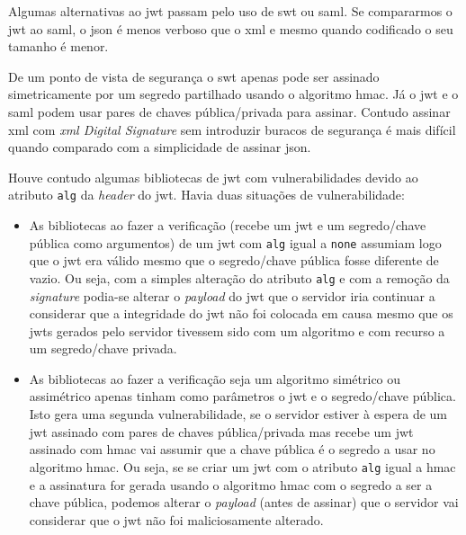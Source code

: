 Algumas alternativas ao \acrshort{jwt} passam pelo uso de \acrfull{swt} ou \acrfull{saml}. Se compararmos o \acrshort{jwt} ao \acrshort{saml}, o \acrshort{json} é menos verboso que o \acrshort{xml} e mesmo quando codificado o seu tamanho é menor. 

De um ponto de vista de segurança o \acrshort{swt} apenas pode ser assinado simetricamente por um segredo partilhado usando o algoritmo \acrshort{hmac}. Já o \acrshort{jwt} e o \acrshort{saml} podem usar pares de chaves pública/privada para assinar. Contudo assinar \acrshort{xml} com \textit{\acrshort{xml} Digital Signature} sem introduzir buracos de segurança é mais difícil quando comparado com a simplicidade de assinar \acrshort{json}.~\cite{jwtio}

Houve contudo algumas bibliotecas de \acrshort{jwt} com vulnerabilidades devido ao atributo \texttt{alg} da \textit{header} do \acrshort{jwt}. Havia duas situações de vulnerabilidade:
\begin{itemize}
    \item As bibliotecas ao fazer a verificação (recebe um \acrshort{jwt} e um segredo/chave pública como argumentos) de um \acrshort{jwt} com \texttt{alg} igual a \texttt{none} assumiam logo que o \acrshort{jwt} era válido mesmo que o segredo/chave pública fosse diferente de vazio. Ou seja, com a simples alteração do atributo \texttt{alg} e com a remoção da \textit{signature} podia-se alterar o \textit{payload} do \acrshort{jwt} que o servidor iria continuar a considerar que a integridade do \acrshort{jwt} não foi colocada em causa mesmo que os \acrshort{jwt}s gerados pelo servidor tivessem sido com um algoritmo e com recurso a um segredo/chave privada.
    \item As bibliotecas ao fazer a verificação seja um algoritmo simétrico ou assimétrico apenas tinham como parâmetros o \acrshort{jwt} e o segredo/chave pública. Isto gera uma segunda vulnerabilidade, se o servidor estiver à espera de um \acrshort{jwt} assinado com pares de chaves pública/privada mas recebe um \acrshort{jwt} assinado com \acrshort{hmac} vai assumir que a chave pública é o segredo a usar no algoritmo \acrshort{hmac}. Ou seja, se se criar um \acrshort{jwt} com o atributo \texttt{alg} igual a \acrshort{hmac} e a assinatura for gerada usando o algoritmo \acrshort{hmac} com o segredo a ser a chave pública, podemos alterar o \textit{payload} (antes de assinar) que o servidor vai considerar que o \acrshort{jwt} não foi maliciosamente alterado.
\end{itemize}

